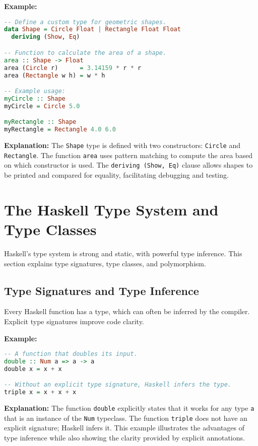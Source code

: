 \documentclass[11pt,a4paper]{article}
\begin{document}
\textbf{Example:}
\begin{lstlisting}[language=Haskell]
-- Define a custom type for geometric shapes.
data Shape = Circle Float | Rectangle Float Float
  deriving (Show, Eq)

-- Function to calculate the area of a shape.
area :: Shape -> Float
area (Circle r)      = 3.14159 * r * r
area (Rectangle w h) = w * h

-- Example usage:
myCircle :: Shape
myCircle = Circle 5.0

myRectangle :: Shape
myRectangle = Rectangle 4.0 6.0
\end{lstlisting}

\textbf{Explanation:}  
The \texttt{Shape} type is defined with two constructors: \texttt{Circle} and \texttt{Rectangle}. The function \texttt{area} uses pattern matching to compute the area based on which constructor is used. The \texttt{deriving (Show, Eq)} clause allows shapes to be printed and compared for equality, facilitating debugging and testing.

\section{The Haskell Type System and Type Classes}
Haskell's type system is strong and static, with powerful type inference. This section explains type signatures, type classes, and polymorphism.

\subsection{Type Signatures and Type Inference}
Every Haskell function has a type, which can often be inferred by the compiler. Explicit type signatures improve code clarity.

\textbf{Example:}
\begin{lstlisting}[language=Haskell]
-- A function that doubles its input.
double :: Num a => a -> a
double x = x + x

-- Without an explicit type signature, Haskell infers the type.
triple x = x + x + x
\end{lstlisting}

\textbf{Explanation:}  
The function \texttt{double} explicitly states that it works for any type \texttt{a} that is an instance of the \texttt{Num} typeclass. The function \texttt{triple} does not have an explicit signature; Haskell infers it. This example illustrates the advantages of type inference while also showing the clarity provided by explicit annotations.
\end{document}
